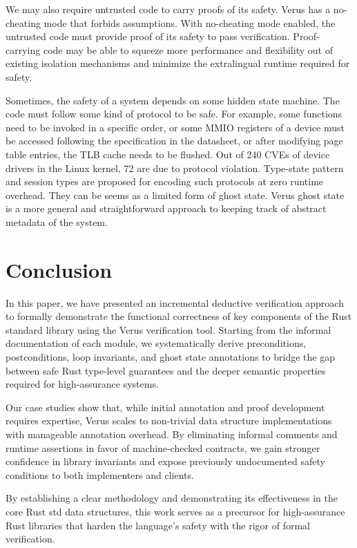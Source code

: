 \documentclass[conference]{IEEEtran}
\begin{document}
We may also require untrusted code to carry proofs of its safety. Verus has a no-cheating mode that forbids assumptions. With no-cheating mode enabled, the untrusted code must provide proof of its safety to pass verification. Proof-carrying code may be able to squeeze more performance and flexibility out of existing isolation mechanisms and minimize the extralingual runtime required for safety.

Sometimes, the safety of a system depends on some hidden state machine. The code must follow some kind of protocol to be safe. For example, some functions need to be invoked in a specific order, or some MMIO registers of a device must be accessed following the specification in the datasheet, or after modifying page table entries, the TLB cache needs to be flushed. Out of 240 CVEs of device drivers in the Linux kernel, 72 are due to protocol violation\cite{RFL_security}. Type-state pattern and session types\cite{sessiontype} are proposed for encoding such protocols at zero runtime overhead. They can be seems as a limited form of ghost state. Verus ghost state is a more general and straightforward approach to keeping track of abstract metadata of the system.       

\section{Conclusion}
In this paper, we have presented an incremental deductive verification approach to formally demonstrate the functional correctness of key components of the Rust standard library using the Verus verification tool. Starting from the informal documentation of each module, we systematically derive preconditions, postconditions, loop invariants, and ghost state annotations to bridge the gap between safe Rust type-level guarantees and the deeper semantic properties required for high‐assurance systems.

Our case studies show that, while initial annotation and proof development requires expertise, Verus scales to non-trivial data structure implementations with manageable annotation overhead. By eliminating informal comments and runtime assertions in favor of machine‐checked contracts, we gain stronger confidence in library invariants and expose previously undocumented safety conditions to both implementers and clients.

By establishing a clear methodology and demonstrating its effectiveness in the core Rust std data structures, this work serves as a precursor for high-assurance Rust libraries that harden the language’s safety with the rigor of formal verification.
\end{document}
